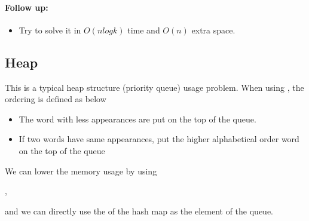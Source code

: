 \paragraph{Follow up:}

\begin{itemize}
\item Try to solve it in $ O(n log k) $ time and $ O(n) $ extra space.
\end{itemize}

\subsection{Heap}
This is a typical heap structure (priority queue) usage problem. When using , the ordering is defined as below
\begin{itemize}
\item The word with less appearances are put on the top of the queue.
\item If two words have same appearances, put the higher alphabetical order word on the top of the queue
\end{itemize}

We can lower the memory usage by using 

, 

and we can directly use the  of the hash map as the element of the queue.

